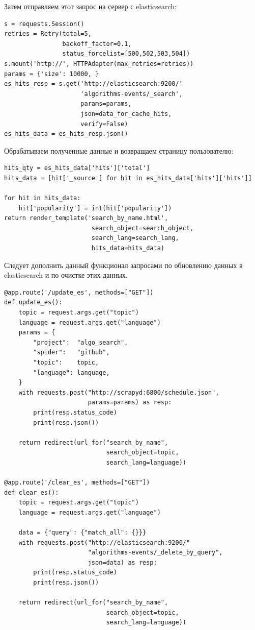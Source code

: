 Затем отправляем этот запрос на сервер с elasticsearch:
\begin{verbatim}
s = requests.Session()
retries = Retry(total=5,
                backoff_factor=0.1,
                status_forcelist=[500,502,503,504])
s.mount('http://', HTTPAdapter(max_retries=retries))
params = {'size': 10000, }
es_hits_resp = s.get('http://elasticsearch:9200/'
                     'algorithms-events/_search',
                     params=params,
                     json=data_for_cache_hits,
                     verify=False)
es_hits_data = es_hits_resp.json()
\end{verbatim}

Обрабатываем полученные данные и возвращаем страницу пользователю:
\begin{verbatim}
hits_qty = es_hits_data['hits']['total']
hits_data = [hit['_source'] for hit in es_hits_data['hits']['hits']]

for hit in hits_data:
    hit['popularity'] = int(hit['popularity'])
return render_template('search_by_name.html',
                        search_object=search_object,
                        search_lang=search_lang,
                        hits_data=hits_data)
\end{verbatim}

Следует дополнить данный функционал запросами по обновлению данных в
elasticsearch и по очистке этих данных.
\begin{verbatim}
@app.route('/update_es', methods=["GET"])
def update_es():
    topic = request.args.get("topic")
    language = request.args.get("language")
    params = {
        "project":  "algo_search",
        "spider":   "github",
        "topic":    topic,
        "language": language,
    }
    with requests.post("http://scrapyd:6800/schedule.json",
                       params=params) as resp:
        print(resp.status_code)
        print(resp.json())

    return redirect(url_for("search_by_name",
                            search_object=topic,
                            search_lang=language))

@app.route('/clear_es', methods=["GET"])
def clear_es():
    topic = request.args.get("topic")
    language = request.args.get("language")

    data = {"query": {"match_all": {}}}
    with requests.post("http://elasticsearch:9200/"
                       "algorithms-events/_delete_by_query",
                       json=data) as resp:
        print(resp.status_code)
        print(resp.json())

    return redirect(url_for("search_by_name",
                            search_object=topic,
                            search_lang=language))
\end{verbatim}

